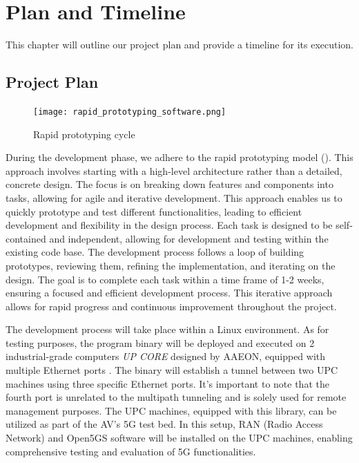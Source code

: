 \chapter{Plan and Timeline}\minitoc\label{sec:plan}\vspace{.5cm}

This chapter will outline our project plan and provide a timeline for its execution.

\section{Project Plan}

\begin{figure}[H]
	\centering
	\texttt{[image: rapid\_prototyping\_software.png]}
	\caption{Rapid prototyping cycle \cite{marketsplash_rapid_2021}}
	\label{fig:plan:rapid_prototyping_software}
\end{figure}

During the development phase, we adhere to the rapid prototyping model (). 
This approach involves starting with a high-level architecture rather than a detailed, concrete design. 
The focus is on breaking down features and components into tasks, allowing for agile and iterative development. 
This approach enables us to quickly prototype and test different functionalities, leading to efficient development and flexibility in the design process.
Each task is designed to be self-contained and independent, allowing for development and testing within the existing code base. 
The development process follows a loop of building prototypes, reviewing them, refining the implementation, and iterating on the design. 
The goal is to complete each task within a time frame of 1-2 weeks, ensuring a focused and efficient development process. This iterative approach allows for rapid progress and continuous improvement throughout the project.

The development process will take place within a Linux environment. 
As for testing purposes, the program binary will be deployed and executed on 2 industrial-grade computers \textit{UP CORE} designed by \ac{AAEON}, equipped with multiple Ethernet ports \cite{upc_core} \cite{upc_extension_board}. 
The binary will establish a tunnel between two UPC machines using three specific Ethernet ports. 
It's important to note that the fourth port is unrelated to the multipath tunneling and is solely used for remote management purposes.
The UPC machines, equipped with this library, can be utilized as part of the AV's 5G test bed. 
In this setup, RAN (Radio Access Network) and Open5GS software will be installed on the UPC machines, enabling comprehensive testing and evaluation of 5G functionalities.

